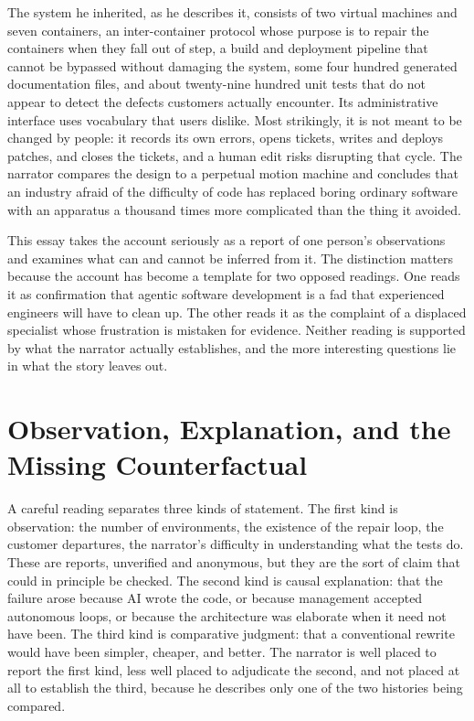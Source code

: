 \documentclass[11pt]{article}
\theoremstyle{remark}
\begin{document}
The system he inherited, as he describes it, consists of two virtual machines and seven containers, an inter-container protocol whose purpose is to repair the containers when they fall out of step, a build and deployment pipeline that cannot be bypassed without damaging the system, some four hundred generated documentation files, and about twenty-nine hundred unit tests that do not appear to detect the defects customers actually encounter. Its administrative interface uses vocabulary that users dislike. Most strikingly, it is not meant to be changed by people: it records its own errors, opens tickets, writes and deploys patches, and closes the tickets, and a human edit risks disrupting that cycle. The narrator compares the design to a perpetual motion machine and concludes that an industry afraid of the difficulty of code has replaced boring ordinary software with an apparatus a thousand times more complicated than the thing it avoided.

This essay takes the account seriously as a report of one person's observations and examines what can and cannot be inferred from it. The distinction matters because the account has become a template for two opposed readings. One reads it as confirmation that agentic software development is a fad that experienced engineers will have to clean up. The other reads it as the complaint of a displaced specialist whose frustration is mistaken for evidence. Neither reading is supported by what the narrator actually establishes, and the more interesting questions lie in what the story leaves out.

\section{Observation, Explanation, and the Missing Counterfactual}

A careful reading separates three kinds of statement. The first kind is observation: the number of environments, the existence of the repair loop, the customer departures, the narrator's difficulty in understanding what the tests do. These are reports, unverified and anonymous, but they are the sort of claim that could in principle be checked. The second kind is causal explanation: that the failure arose because AI wrote the code, or because management accepted autonomous loops, or because the architecture was elaborate when it need not have been. The third kind is comparative judgment: that a conventional rewrite would have been simpler, cheaper, and better. The narrator is well placed to report the first kind, less well placed to adjudicate the second, and not placed at all to establish the third, because he describes only one of the two histories being compared.
\end{document}
